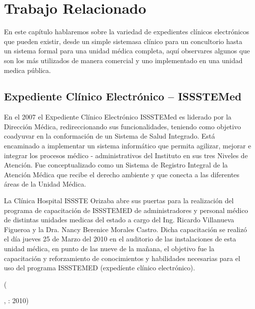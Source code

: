 \chapter{Trabajo Relacionado}

En este capítulo hablaremos sobre la variedad de expedientes clínicos electrónicos que pueden existir, desde un simple sistemasa clínico para un concultorio hasta un sistema formal para una unidad médica completa, aquí observares algunos que son los más utilizados de manera comercial y uno implementado en una unidad medica pública.

\section{Expediente Clínico Electrónico – ISSSTEMed}

En el 2007 el Expediente Clínico Electrónico ISSSTEMed es liderado por la Dirección Médica, redireccionando sus funcionalidades, teniendo como objetivo coadyuvar en la conformación de un Sistema de Salud Integrado. Está encaminado a implementar un sistema informático que permita agilizar, mejorar e integrar los procesos médico - administrativos del Instituto en sus tres Niveles de Atención. Fue conceptualizado como un Sistema de Registro Integral de la Atención Médica que recibe el derecho ambiente y que conecta a las diferentes áreas de la Unidad Médica. \cite{ISSTE}

\begin{center}
  \begin{minipage}{0.9\linewidth}
    \vspace{5pt}%
    {\small
    La Clínica Hospital ISSSTE Orizaba abre sus puertas para la realización del programa de capacitación de ISSSTEMED de administradores y personal médico de distintas unidades medicas del estado a cargo del Ing. Ricardo Villanueva Figueroa y la Dra. Nancy Berenice Morales Castro.
    Dicha capacitación se realizó el día  jueves 25 de Marzo del 2010 en el auditorio de las instalaciones de esta unidad médica, en punto de las nueve de la mañana, el objetivo fue la capacitación y reforzamiento de conocimientos y habilidades necesarias para el uso del programa ISSSTEMED (expedíente clínico electrónico).
    }
    \begin{flushright}
      (\author{Imágen del golfo.},
      : 2010)
    \end{flushright}
      \vspace{5pt}%
  \end{minipage}
\end{center}

